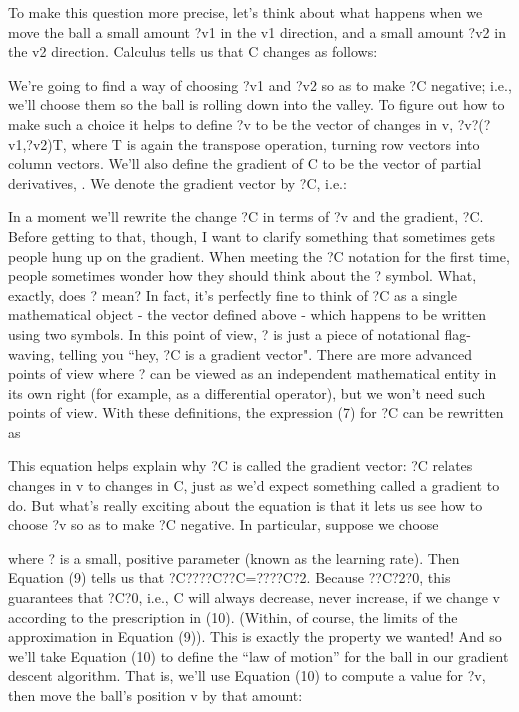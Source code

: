 To make this question more precise, let's think about what happens when we move the ball a small amount ?v1 in the v1 direction, and a small amount ?v2 in the v2 direction. Calculus tells us that C changes as follows: 

We're going to find a way of choosing ?v1 and ?v2 so as to make ?C negative; i.e., we'll choose them so the ball is rolling down into the valley. To figure out how to make such a choice it helps to define ?v to be the vector of changes in v, ?v?(?v1,?v2)T, where T is again the transpose operation, turning row vectors into column vectors. We'll also define the gradient of C to be the vector of partial derivatives, . We denote the gradient vector by ?C, i.e.: 

In a moment we'll rewrite the change ?C in terms of ?v and the gradient, ?C. Before getting to that, though, I want to clarify something that sometimes gets people hung up on the gradient. When meeting the ?C notation for the first time, people sometimes wonder how they should think about the ? symbol. What, exactly, does ? mean? In fact, it's perfectly fine to think of ?C as a single mathematical object - the vector defined above - which happens to be written using two symbols. In this point of view, ? is just a piece of notational flag-waving, telling you ``hey, ?C is a gradient vector". There are more advanced points of view where ? can be viewed as an independent mathematical entity in its own right (for example, as a differential operator), but we won't need such points of view.
With these definitions, the expression (7) for ?C can be rewritten as 

This equation helps explain why ?C is called the gradient vector: ?C relates changes in v to changes in C, just as we'd expect something called a gradient to do. But what's really exciting about the equation is that it lets us see how to choose ?v so as to make ?C negative. In particular, suppose we choose 

where ? is a small, positive parameter (known as the learning rate). Then Equation (9) tells us that ?C????C??C=????C?2. Because ??C?2?0, this guarantees that ?C?0, i.e., C will always decrease, never increase, if we change v according to the prescription in (10). (Within, of course, the limits of the approximation in Equation (9)). This is exactly the property we wanted! And so we'll take Equation (10) to define the ``law of motion'' for the ball in our gradient descent algorithm. That is, we'll use Equation (10) to compute a value for ?v, then move the ball's position v by that amount: 

